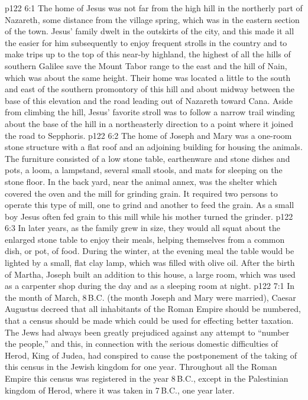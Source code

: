 \vs p122 6:1 The home of Jesus was not far from the high hill in the northerly part of Nazareth, some distance from the village spring, which was in the eastern section of the town. Jesus’ family dwelt in the outskirts of the city, and this made it all the easier for him subsequently to enjoy frequent strolls in the country and to make trips up to the top of this near\hyp{}by highland, the highest of all the hills of southern Galilee save the Mount Tabor range to the east and the hill of Nain, which was about the same height. Their home was located a little to the south and east of the southern promontory of this hill and about midway between the base of this elevation and the road leading out of Nazareth toward Cana. Aside from climbing the hill, Jesus’ favorite stroll was to follow a narrow trail winding about the base of the hill in a northeasterly direction to a point where it joined the road to Sepphoris.
\vs p122 6:2 The home of Joseph and Mary was a one\hyp{}room stone structure with a flat roof and an adjoining building for housing the animals. The furniture consisted of a low stone table, earthenware and stone dishes and pots, a loom, a lampstand, several small stools, and mats for sleeping on the stone floor. In the back yard, near the animal annex, was the shelter which covered the oven and the mill for grinding grain. It required two persons to operate this type of mill, one to grind and another to feed the grain. As a small boy Jesus often fed grain to this mill while his mother turned the grinder.
\vs p122 6:3 In later years, as the family grew in size, they would all squat about the enlarged stone table to enjoy their meals, helping themselves from a common dish, or pot, of food. During the winter, at the evening meal the table would be lighted by a small, flat clay lamp, which was filled with olive oil. After the birth of Martha, Joseph built an addition to this house, a large room, which was used as a carpenter shop during the day and as a sleeping room at night.
\vs p122 7:1 In the month of March, 8\,B.C. (the month Joseph and Mary were married), Caesar Augustus decreed that all inhabitants of the Roman Empire should be numbered, that a census should be made which could be used for effecting better taxation. The Jews had always been greatly prejudiced against any attempt to “number the people,” and this, in connection with the serious domestic difficulties of Herod, King of Judea, had conspired to cause the postponement of the taking of this census in the Jewish kingdom for one year. Throughout all the Roman Empire this census was registered in the year 8\,B.C., except in the Palestinian kingdom of Herod, where it was taken in 7\,B.C., one year later.
